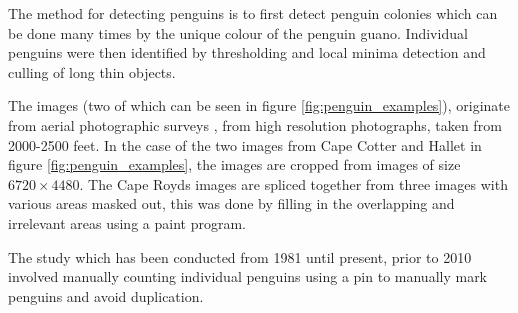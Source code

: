 The method for detecting penguins is to first detect penguin colonies which can be done many times by the unique colour of the penguin guano. Individual penguins were then identified by thresholding and local minima detection and culling of long thin objects. 

The images (two of which can be seen in figure \ref{fig:penguin_examples}), originate from aerial photographic surveys \cite{Lyver2014}, from high resolution photographs, taken from 2000-2500 feet. In the case of the two images from Cape Cotter and Hallet in figure \ref{fig:penguin_examples}, the images are cropped from images of size $ 6720\times4480 $. The Cape Royds images are spliced together from three images with various areas masked out, this was done by filling in the overlapping and irrelevant areas using a paint program.

The study which has been conducted from 1981 until present, prior to 2010 involved manually counting individual penguins using a pin to manually mark penguins and avoid duplication. 


